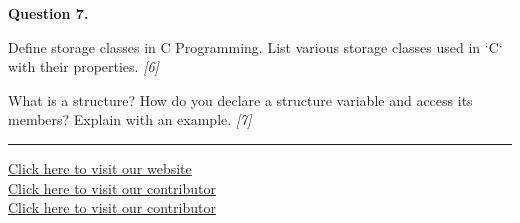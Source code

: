 \documentclass[11pt,a4paper]{article}
\newcommand{\pts}[1]{\hfill   \textit{[#1]}}
\begin{document}
\medskip


\noindent   \textbf{Question 7.}

\begin{parts}
  \item Define storage classes in C Programming. List various storage classes used in `C` with their properties. \pts{6}
  \item What is a structure? How do you declare a structure variable and access its members? Explain with an example. \pts{7}
\end{parts}

\vfill
\rule{\linewidth}{0.4pt}

\begin{center}\small
\href{https://bhu-exam.vercel.app/}{Click here to visit our website}\\[4pt]\href{https://me-aryan.vercel.app/}{Click here to visit our contributor}\\[4pt]\href{https://quashan-me.vercel.app/}{Click here to visit our contributor}
\end{center}
\end{document}
